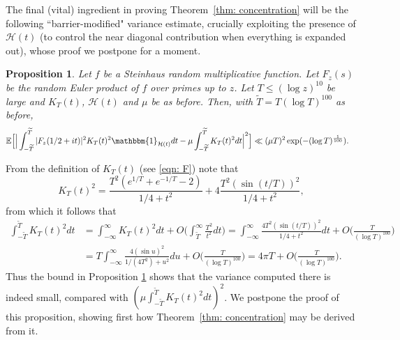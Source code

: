 \documentclass[12pt, notitlepage]{amsart}
\numberwithin{equation}{section}
\def\E{\mathbb E}
\def\TT{\widetilde{T}}
\newtheorem{proposition}[theorem]{Proposition}
\theoremstyle{remark}
\theoremstyle{definition}
\theoremstyle{remark}
\numberwithin{equation}{section}
\begin{document}
The final (vital) ingredient in proving Theorem~\ref{thm: concentration} will be the following ``barrier-modified" variance estimate, crucially exploiting the presence of $\mathcal{H}(t)$ (to control the near diagonal contribution when everything is expanded out), whose proof we postpone for a moment.
\begin{proposition}\label{prop: concentration}
Let $f$ be a Steinhaus random multiplicative function. Let $F_z(s)$ be the random Euler product of $f$ over primes up to $z$. Let $T\le (\log z)^{10}$ be large and $K_T(t)$, $\mathcal{H}(t)$ and $\mu$ be as before. 
Then, with $\TT = T(\log T)^{100}$ as before, 
\begin{equation}\label{eqn: AJHdisp}
    \begin{split}
& \E\Big[ \Big|\int_{-\TT}^{\TT}|F_z(1/2+it)|^{2} K_T(t)^{2} \mathbbm{1}_{\mathcal{H}(t)} dt- \mu \int_{-\TT}^{\TT}K_T(t)^{2}  dt\Big|^{2}\Big] \ll 
 ( \mu T)^{2} \exp(-( \log T)^{\frac 1{100}}).       
    \end{split}
\end{equation}
\end{proposition}

From the definition of $K_T(t)$ (see \eqref{eqn: F}) note that 
$$ 
K_T(t)^2 = \frac{T^2 (e^{1/T} +e^{-1/T}-2)}{1/4+t^2} + 4 \frac{T^2 (\sin (t/T))^2}{1/4+t^2}, 
$$ 
from which it follows that 
\begin{align} 
\label{3.21} 
\int_{-\TT}^{\TT} K_T(t)^2 dt &= \int_{-\infty}^{\infty} K_T(t)^2 dt +O\Big(\int_{\TT}^{\infty} \frac{T^2}{t^2}dt\Big) = \int_{-\infty}^{\infty} \frac{4T^2 (\sin (t/T))^2}{1/4+t^2} dt +O\Big(\frac{T}{(\log T)^{100}}\Big) \nonumber \\
&= T \int_{-\infty}^{\infty} \frac{4 (\sin u)^2}{1/(4T^2) +u^2} du + O\Big(\frac{T}{(\log T)^{100}}\Big) = 4\pi T + O\Big(\frac{T}{(\log T)^{100}}\Big). 
\end{align} 
Thus the bound in Proposition \ref{prop: concentration} shows that the variance computed there is indeed small, compared with $( \mu \int_{-\TT}^{\TT}K_T(t)^{2}  dt )^2$.   We postpone the proof of this proposition, showing first how Theorem~\ref{thm: concentration} may be derived from it.   
\end{document}
